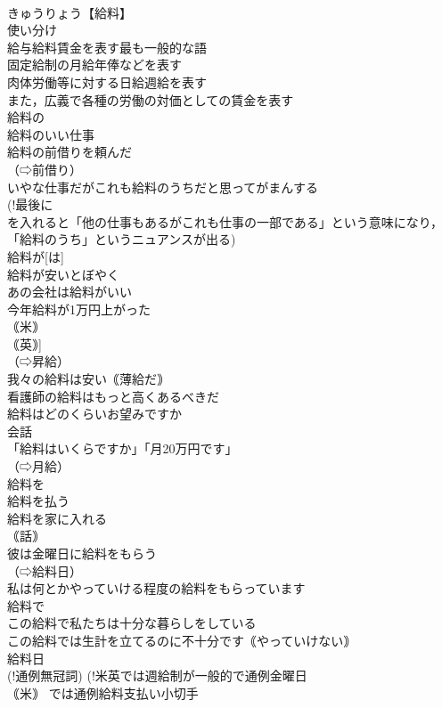 \documentclass[8pt]{extreport}
\begin{document}
\begin{CJK}{UTF8}{min}
\\	きゅうりょう【給料】
\\	使い分け
\\	給与給料賃金を表す最も一般的な語
\\	固定給制の月給年俸などを表す
\\	肉体労働等に対する日給週給を表す
\\	また，広義で各種の労働の対価としての賃金を表す
\\	給料の
\\	給料のいい仕事
\\	給料の前借りを頼んだ
\\	（⇨前借り）
\\	いやな仕事だがこれも給料のうちだと思ってがまんする
\\	(!最後に 
\\	を入れると「他の仕事もあるがこれも仕事の一部である」という意味になり，「給料のうち」というニュアンスが出る)
\\	給料が[は]
\\	給料が安いとぼやく
\\	あの会社は給料がいい
\\	今年給料が1万円上がった
\\	｟米｠ 
\\	｟英｠] 
\\	（⇨昇給）
\\	我々の給料は安い｟薄給だ｠
\\	看護師の給料はもっと高くあるべきだ
\\	給料はどのくらいお望みですか
\\	会話
\\	「給料はいくらですか」「月20万円です」
\\	（⇨月給）
\\	給料を
\\	給料を払う
\\	給料を家に入れる
\\	｟話｠
\\	彼は金曜日に給料をもらう
\\	（⇨給料日）
\\	私は何とかやっていける程度の給料をもらっています
\\	給料で
\\	この給料で私たちは十分な暮らしをしている
\\	この給料では生計を立てるのに不十分です｟やっていけない｠
\\	給料日
\\	(!通例無冠詞) (!米英では週給制が一般的で通例金曜日
\\	｟米｠ では通例給料支払い小切手 

\end{CJK}
\end{document}
